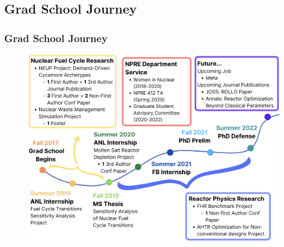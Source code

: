 \subsection*{Grad School Journey}
\begin{frame}
    \frametitle{Grad School Journey}
    \vspace{-0.2cm}
    \begin{figure}[]
        \includegraphics[width=0.85\linewidth]{figures/grad-school-journey.png} 
    \end{figure}
\end{frame}

